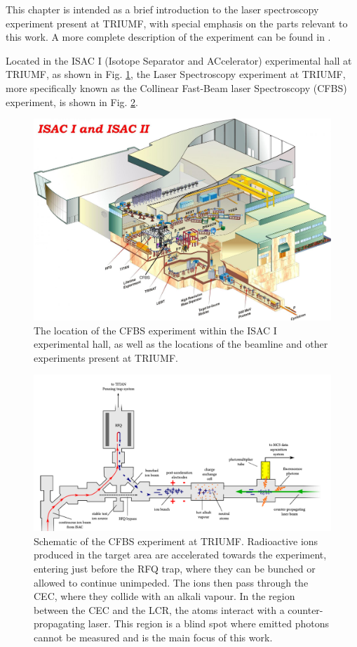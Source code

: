 \noindent This chapter is intended as a brief introduction to the laser spectroscopy experiment present at TRIUMF, with special emphasis on the parts relevant to this work. A more complete description of the experiment can be found in \cite{CFBS}.

Located in the ISAC I (Isotope Separator and ACcelerator) experimental hall at TRIUMF, as shown in Fig. \ref{loc}, the Laser Spectroscopy experiment at TRIUMF, more specifically known as the Collinear Fast-Beam laser Spectroscopy (CFBS) experiment, is shown in Fig. \ref{exp}.


\begin{figure}[h]
\includegraphics[width=\textwidth]{Laser_spec_triumf/ISAC.png}
\caption{\small The location of the CFBS experiment within the ISAC I experimental hall, as well as the locations of the beamline and other experiments present at TRIUMF.}
\label{loc}
\end{figure}

\begin{figure}[h]
\includegraphics[width=\textwidth]{Laser_spec_triumf/experiment.png}
\caption{\small Schematic of the CFBS experiment at TRIUMF.\cite{CFBS} Radioactive ions produced in the target area are accelerated towards the experiment, entering just before the RFQ trap, where they can be bunched or allowed to continue unimpeded. The ions then pass through the CEC, where they collide with an alkali vapour. In the region between the CEC and the LCR, the atoms interact with a counter-propagating laser. This region is a blind spot where emitted photons cannot be measured and is the main focus of this work.}
\label{exp}
\end{figure}


